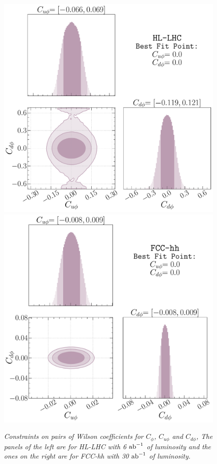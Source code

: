 \begin{figure}[t!]
	\includegraphics[width=0.47\linewidth]{fig/kappa_u-kappa_d-HL-LHC.pdf}
	\includegraphics[width=0.47\linewidth]{fig/kappa_u-kappa_d-FCC-hh.pdf}
	\caption{\it Constraints on pairs of Wilson coefficients for $C_\phi$, $C_{u\phi}$ and $C_{d\phi}$, The panels of the left are for HL-LHC with 6 $\text{ab}^{-1}$ of luminosity and the ones on the right are for FCC-hh with 30 $\text{ab}^{-1}$ of luminosity.}
	\label{fig:constraint2d}
\end{figure}
\FloatBarrier

